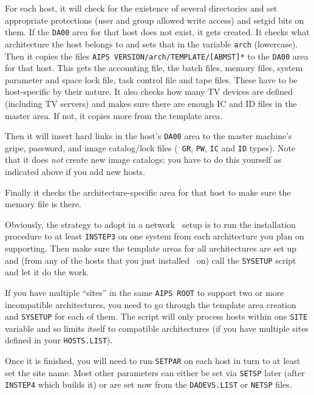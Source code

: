 For each host, it will check for the existence of several directories
and set appropriate protections (user and group allowed write access)
and setgid bits on them.  If the {\tt\dol DA00} area for that host does not
exist, it gets created.  It checks what architecture the host belongs to
and sets that in the variable {\tt\dol arch} (lowercase).  Then it copies
the files {\tt\dol AIPS VERSION/\dol arch/TEMPLATE/[ABMST]*} to the
{\tt\dol DA00} area for that host.  This gets the accounting file, the
batch files, memory files, system parameter and space lock file, task
control file and tape files.  These have to be host-specific by their
nature.  It also checks how many TV devices are defined (including TV
servers) and makes sure there are enough IC and ID files in the master
area.  If not, it copies more from the template area.

Then it will insert hard links in the host's {\tt\dol DA00} area to the
master machine's gripe, password, and image catalog/lock files ({\tt
GR}, {\tt PW}, {\tt IC} and {\tt ID} types).  Note that it does {\it
not} create new image catalogs; you have to do this yourself as
indicated above if you add new hosts.

Finally it checks the architecture-specific area for that host to make
sure the memory file is there.

Obviously, the strategy to adopt in a network \AIPS\ setup is to run
the installation procedure to at least {\tt INSTEP3} on one system
from each architecture you plan on supporting.  Then make sure the
template areas for all architectures are set up and (from any of the
hosts that you just installed \AIPS\ on) call the {\tt SYSETUP} script
and let it do the work.

If you have multiple ``sites'' in the same {\tt\dol AIPS ROOT} to
support two or more incompatible architectures, you need to go through the
template area creation and {\tt SYSETUP} for each of them.  The
script will only process hosts within one {\tt\dol SITE} variable and so
limits itself to compatible architectures (if you have multiple sites
defined in your {\tt HOSTS.LIST}).

Once it is finished, you will need to run {\tt SETPAR} on each host in
turn to at least set the site name.  Most other parameters can either
be set via {\tt SETSP} later (after {\tt INSTEP4} which builds it) or
are set now from the {\tt DADEVS.LIST} or {\tt NETSP} files.
\medskip



